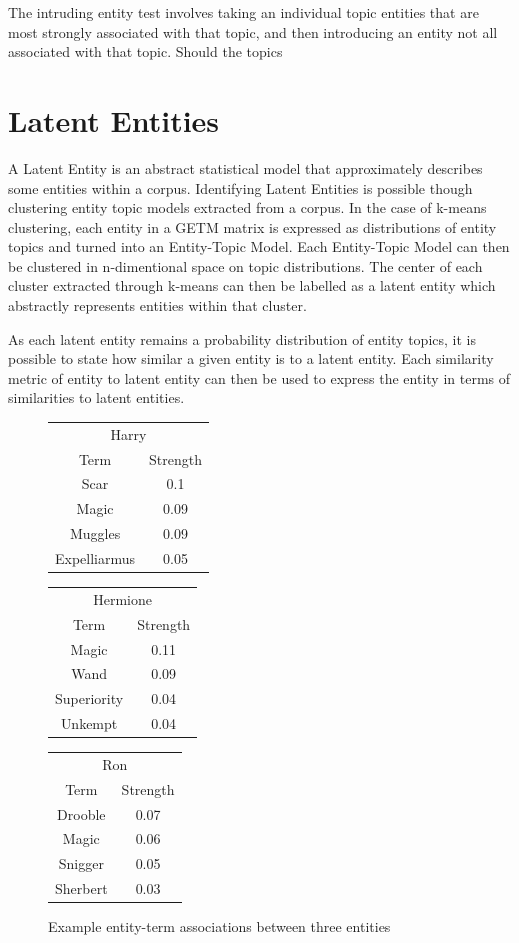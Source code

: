 \documentclass[10pt]{report}
\begin{document}
The intruding entity test involves taking an individual topic entities that are most strongly associated with that topic, and then introducing an entity not all associated with that topic. Should the topics 

\section{Latent Entities}
A Latent Entity is an abstract statistical model that approximately describes some entities within a corpus. Identifying Latent Entities is possible though clustering entity topic models extracted from a corpus. In the case of k-means clustering, each entity in a GETM matrix is expressed as distributions of entity topics and turned into an Entity-Topic Model. Each Entity-Topic Model can then be clustered in n-dimentional space on topic distributions. The center of each cluster extracted through k-means can then be labelled as a latent entity which abstractly represents entities within that cluster.

As each latent entity remains a probability distribution of entity topics, it is possible to state how similar a given entity is to a latent entity. Each similarity metric of entity to latent entity can then be used to express the entity in terms of similarities to latent entities.

\begin{figure}[h]
  \centering
  \begin{tabular}{*2c}
      \multicolumn{2}{c}{Harry}\\
      Term&Strength\\
      \hline
      Scar&0.1\\
      Magic&0.09\\
      Muggles&0.09\\
      Expelliarmus&0.05
    \end{tabular}              
    \begin{tabular}{*2c}
      \multicolumn{2}{c}{Hermione}\\
      Term&Strength\\
      \hline
      Magic&0.11\\
      Wand&0.09\\
      Superiority&0.04\\
      Unkempt&0.04      
    \end{tabular}
    \begin{tabular}{*2c}
      \multicolumn{2}{c}{Ron}\\
      Term&Strength\\
      \hline
      Drooble&0.07\\
      Magic&0.06\\
      Snigger&0.05\\
      Sherbert&0.03
    \end{tabular}
  \caption{Example entity-term associations between three entities\label{fig:example_entity_term_associations}}
\end{figure}
\end{document}
